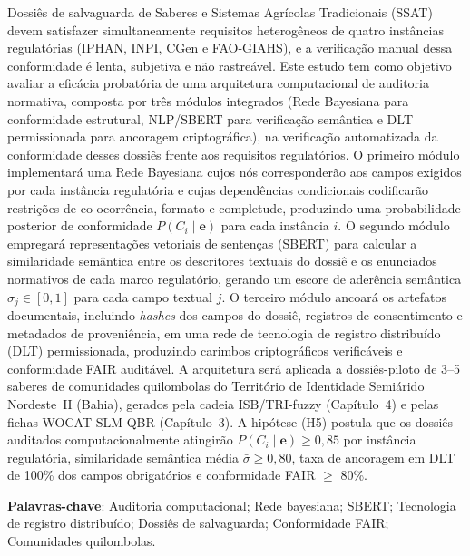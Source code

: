 {\renewcommand{\PRIVATEbookmarkthis}[1]{}%
\begin{resumoumacoluna}
Dossiês de salvaguarda de Saberes e Sistemas Agrícolas Tradicionais (SSAT) devem satisfazer simultaneamente requisitos heterogêneos de quatro instâncias regulatórias (IPHAN, INPI, CGen e FAO-GIAHS), e a verificação manual dessa conformidade é lenta, subjetiva e não rastreável. Este estudo tem como objetivo avaliar a eficácia probatória de uma arquitetura computacional de auditoria normativa, composta por três módulos integrados (Rede Bayesiana para conformidade estrutural, NLP/SBERT para verificação semântica e DLT permissionada para ancoragem criptográfica), na verificação automatizada da conformidade desses dossiês frente aos requisitos regulatórios. O primeiro módulo implementará uma Rede Bayesiana cujos nós corresponderão aos campos exigidos por cada instância regulatória e cujas dependências condicionais codificarão restrições de co-ocorrência, formato e completude, produzindo uma probabilidade posterior de conformidade $P(C_i \mid \mathbf{e})$ para cada instância $i$. O segundo módulo empregará representações vetoriais de sentenças (SBERT) para calcular a similaridade semântica entre os descritores textuais do dossiê e os enunciados normativos de cada marco regulatório, gerando um escore de aderência semântica $\sigma_j \in [0,1]$ para cada campo textual $j$. O terceiro módulo ancoará os artefatos documentais, incluindo \textit{hashes} dos campos do dossiê, registros de consentimento e metadados de proveniência, em uma rede de tecnologia de registro distribuído (DLT) permissionada, produzindo carimbos criptográficos verificáveis e conformidade FAIR auditável. A arquitetura será aplicada a dossiês-piloto de 3--5 saberes de comunidades quilombolas do Território de Identidade Semiárido Nordeste~II (Bahia), gerados pela cadeia ISB/TRI-fuzzy (Capítulo~4) e pelas fichas WOCAT-SLM-QBR (Capítulo~3). A hipótese (H5) postula que os dossiês auditados computacionalmente atingirão $P(C_i \mid \mathbf{e}) \geq 0{,}85$ por instância regulatória, similaridade semântica média $\bar{\sigma} \geq 0{,}80$, taxa de ancoragem em DLT de 100\% dos campos obrigatórios e conformidade FAIR $\geq$ 80\%.

\vspace{\onelineskip}
\noindent
\textbf{Palavras-chave}: Auditoria computacional; Rede bayesiana; SBERT; Tecnologia de registro distribuído; Dossiês de salvaguarda; Conformidade FAIR; Comunidades quilombolas.
\end{resumoumacoluna}}

